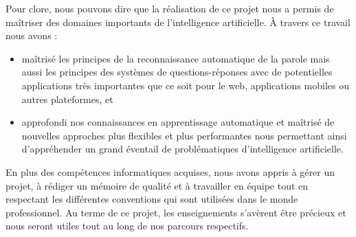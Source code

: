 
Pour clore, nous pouvons dire que la réalisation de ce projet nous a permis de maîtriser des domaines importants de l'intelligence artificielle. À travers ce travail nous avons : 
\begin{itemize}
    \item maîtrisé les principes de la reconnaissance automatique de la parole mais aussi les principes des systèmes de questions-réponses avec de potentielles applications très importantes que ce soit pour le web, applications mobiles ou autres plateformes, et
    \item approfondi nos connaissances en apprentissage automatique et maîtrisé de nouvelles approches plus flexibles et plus performantes nous permettant ainsi d'appréhender un grand éventail de problématiques d'intelligence artificielle. \\
\end{itemize}

En plus des compétences informatiques acquises, nous avons appris à gérer un projet, à rédiger un mémoire de qualité et à travailler en équipe tout en respectant les différentes conventions qui sont utilisées dans le monde professionnel. Au terme de ce projet, les enseignements s'avèrent être précieux et nous seront utiles tout au long de nos parcours respectifs.   
